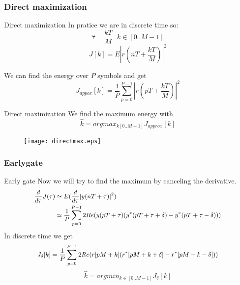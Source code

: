 \documentclass{beamer}
\begin{document}
	\subsubsection{Direct maximization}
	\begin{frame}{Direct maximization}
		In pratice we are in discrete time so:
		$$ \hat{\tau} = \frac{kT}{M} \ \ \ k \in  [0..M-1] $$
		\begin{equation} J[k] = E|r(nT+\frac{kT}{M})|^2 \end{equation}

		We can find the energy over $P$ symbols and get
		\begin{equation}
			J_{appox}[k]= \frac{1}{P} \sum_{p=0}^{P-1} |r(pT + \frac{kT}{M})|^2
		\end{equation}
	\end{frame}

	\begin{frame}{Direct maximization}
		We find the maximum energy with
		\begin{equation}
			\hat{k} = argmax_{k [0 .. M-1]} J_{approx}[k]
		\end{equation}
		\begin{figure}[h!]
			\centering
			\texttt{[image: directmax.eps]}
		\end{figure}		
	\end{frame}
\subsubsection{Earlygate}
	\begin{frame}{Early gate}
		Now we will try to find the maximum by canceling the derivative. 
		\begin{equation}
			\small	
			\begin{split}
				\frac{d}{d\tau} J(\tau) & \simeq E( \frac{d}{d\tau} |y(nT+\tau)|^2)\\
							& \simeq \frac{1}{P} \sum_{p=0}^{P-1} 2Re(y(pT+\tau)(y^*(pT+\tau+\delta)-y^*(pT+\tau-\delta)))
			\end{split}
		\end{equation}
		\normalsize
		In discrete time we get
			\begin{equation}
				\small
				\begin{split}
				J_{\delta}[k] = \frac{1}{P}\sum_{p=0}^{P-1} 2Re(r[pM+k](r^*[pM+k+\delta]-r^*[pM+k-\delta]))
				\end{split}
			\end{equation}
			$$ \hat{k} = argmin_{k\in[0..M-1]} J_{\delta}[k] $$	
	\end{frame}
	
\end{document}
